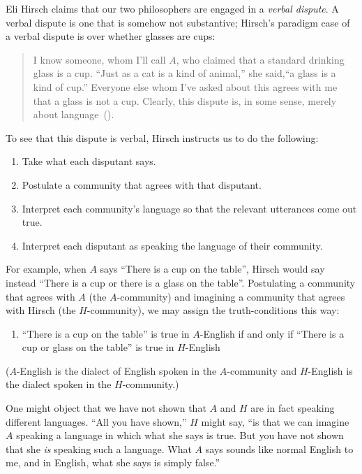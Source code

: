 \documentclass[12pt,twoside]{reedfancy}
\begin{document}
\begin{spacing}{1.25}
Eli Hirsch claims that our two philosophers are engaged in a {\em
  verbal dispute}.  A verbal dispute is one that is somehow not
substantive; Hirsch's paradigm case of a verbal dispute is over
whether glasses are cups:

\begin{quote}
  I know someone, whom I'll call $A$, who claimed that a standard
  drinking glass is a cup.  ``Just as a cat is a kind of animal,'' she
  said,``a glass is a kind of cup.''  Everyone else whom I've asked
  about this agrees with me that a glass is not a cup.  Clearly, this
  dispute is, in some sense, merely about
  language~(\citeyear[69]{hirsch2005}).
\end{quote}

To see that this dispute is verbal, Hirsch instructs us to do the
following:

\begin{enumerate}
  \item Take what each disputant says.
  \item Postulate a community that agrees with that disputant.
  \item Interpret each community's language so that the relevant
    utterances come out true.
  \item Interpret each disputant as speaking the language of their
    community.
\end{enumerate}

For example, when $A$ says ``There is a cup on the table'', Hirsch
would say instead ``There is a cup or there is a glass on the table''.
Postulating a community that agrees with $A$ (the $A$-community) and
imagining a community that agrees with Hirsch (the $H$-community), we
may assign the truth-conditions this way:
\begin{enumerate}[itemindent=25pt, label=(T)]
    \item ``There is a cup on the table'' is true in $A$-English if
      and only if ``There is a cup or glass on the table'' is true in
      $H$-English
\end{enumerate}
($A$-English is the dialect of English spoken in the $A$-community and
$H$-English is the dialect spoken in the $H$-community.)

One might object that we have not shown that $A$ and $H$ are in fact
speaking different languages.  ``All you have shown,'' $H$ might say,
``is that we can imagine $A$ speaking a language in which what she
says is true.  But you have not shown that she {\em is} speaking such
a language.  What $A$ says sounds like normal English to me, and in
English, what she says is simply false.''


\end{spacing}
\end{document}
